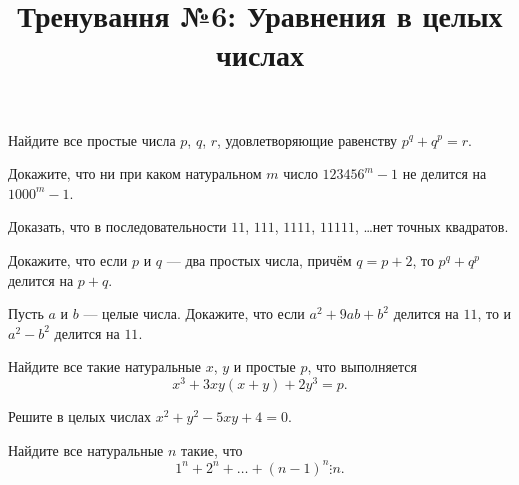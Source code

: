 



\title{Тренування №6: Уравнения в целых числах}
\maketitle

\begin{problem}
	Найдите все простые числа $p$, $q$, $r$, удовлетворяющие равенству $p^q + q^p = r$.
\end{problem}

\begin{problem}
	Докажите, что ни при каком натуральном $m$ число $123456^m - 1$ не делится на $1000^m - 1$.
\end{problem}

\begin{problem}
	Доказать, что в последовательности $11$, $111$, $1111$, $11111$, \dots нет точных квадратов.
\end{problem}

\begin{problem}
	Докажите, что если $p$ и $q$ --- два простых числа, причём $q = p + 2$, то $p^q + q^p$ делится на $p + q$.
\end{problem}

\begin{problem}
	Пусть $a$ и $b$ --- целые числа. Докажите, что если $a^2 + 9ab + b^2$ делится на $11$, то и $a^2 - b^2$ делится на $11$.
\end{problem}

\begin{problem}
	Найдите все такие натуральные $x$, $y$ и простые $p$, что выполняется
\begin{equation}
  x^3 + 3xy(x + y) + 2y^3 = p.
\end{equation}
\end{problem}

\begin{problem}
	Решите в целых числах $x^2 + y^2 - 5xy + 4 = 0$.
\end{problem}

\begin{problem}
	Найдите все натуральные $n$ такие, что
\begin{equation}
  1^n + 2^n + \ldots + (n - 1)^n \vdots n.
\end{equation}
\end{problem}

